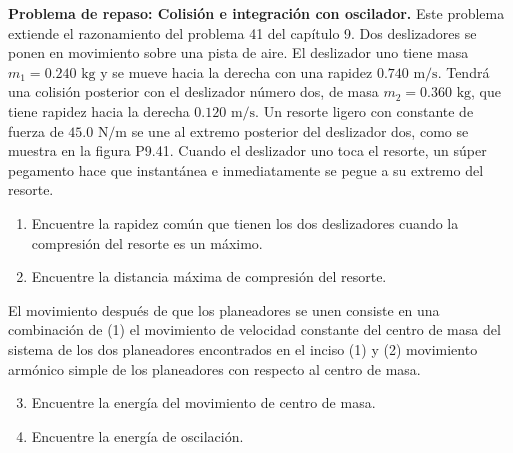 \item \textbf{Problema de repaso: Colisión e integración con oscilador.}
Este problema extiende el razonamiento del problema 41 del capítulo 9. Dos deslizadores se ponen en movimiento sobre una pista de aire. El deslizador uno tiene masa $m_1 = 0.240\text{ kg}$ y se mueve hacia la derecha con una rapidez $0.740\text{ m/s}$. Tendrá una colisión posterior con el deslizador número dos, de masa $m_2 = 0.360\text{ kg}$, que tiene rapidez hacia la derecha $0.120\text{ m/s}$. Un resorte ligero con constante de fuerza de $45.0\text{ N/m}$ se une al extremo posterior del deslizador dos, como se muestra en la figura P9.41. Cuando el deslizador uno toca el resorte, un súper pegamento hace que instantánea e inmediatamente se pegue a su extremo del resorte.
\begin{enumerate}
    \item Encuentre la rapidez común que tienen los dos deslizadores cuando la compresión del resorte es un máximo.
    \item Encuentre la distancia máxima de compresión del resorte.
\end{enumerate}
El movimiento después de que los planeadores se unen consiste en una combinación de (1) el movimiento de velocidad constante del centro de masa del sistema de los dos planeadores encontrados en el inciso (1) y (2) movimiento armónico simple de los planeadores con respecto al centro de masa.
\begin{enumerate}
    \setcounter{enumi}{2}
    \item Encuentre la energía del movimiento de centro de masa.
    \item Encuentre la energía de oscilación.
\end{enumerate}